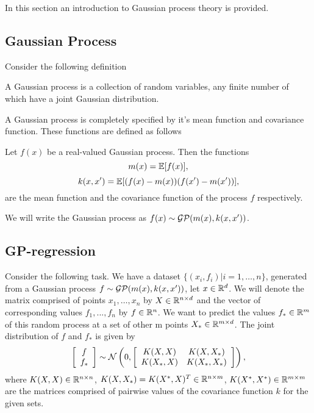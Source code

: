 \documentclass[12pt]{article}
\begin{document}
In this section an introduction to Gaussian process theory is provided.

\subsection{Gaussian Process}

	Consider the following definition
	\begin{definition}
		A Gaussian process is a collection of random variables, any finite number of which have a joint Gaussian distribution.
	\end{definition}
	A Gaussian process is completely specified by it's mean function and covariance function. These functions are defined as follows
	\begin{definition}
		Let $f(x)$ be a real-valued Gaussian process. Then the functions
		$$m(x) = \mathbb{E}[f(x)],$$
		$$k(x, x') = \mathbb{E}[(f(x) - m(x)) (f(x') - m(x'))],$$
		are the mean function and the covariance function of the process $f$ respectively. 
	\end{definition}
	
	We will write the Gaussian process as $f(x) \sim \mathcal{GP}(m(x), k(x, x'))$.
	
\subsection{GP-regression}
	Consider the following task. We have a dataset $\{(x_i, f_i) | i = 1, \ldots, n\}$, generated from a Gaussian process $f \sim \mathcal{GP}(m(x), k(x, x'))$, let $x \in \mathbb{R}^d$.  We will denote the matrix comprised of points $x_1, \ldots, x_n$ by $X \in \mathbb{R}^{n \times d}$ and the vector of corresponding values $f_1, ..., f_n$ by $f \in \mathbb{R}^n$. We want to predict the values $f_* \in \mathbb{R}^m$ of this random process at a set of other m points $X_* \in \mathbb{R}^{m \times d}$. The joint distribution of $f$ and $f_*$ is given by
	$$
	\left [ \begin{array}{c} f\\ f_* \end{array} \right ]
	\sim
	\mathcal{N} \left ( 0, \left [\begin{array}{cc} K(X, X) & K(X, X_*)\\ K(X_*, X) & K(X_*, X_*) \end{array} \right] \right ),
	$$
	where $K(X, X) \in \mathbb{R}^{n \times n}$, $K(X, X_*) = K(X^*, X)^T \in \mathbb{R}^{n \times m}$, $K(X^*, X^*) \in \mathbb{R}^{m \times m}$ are the matrices comprised of pairwise values of the covariance function $k$ for the given sets.
	
\end{document}
